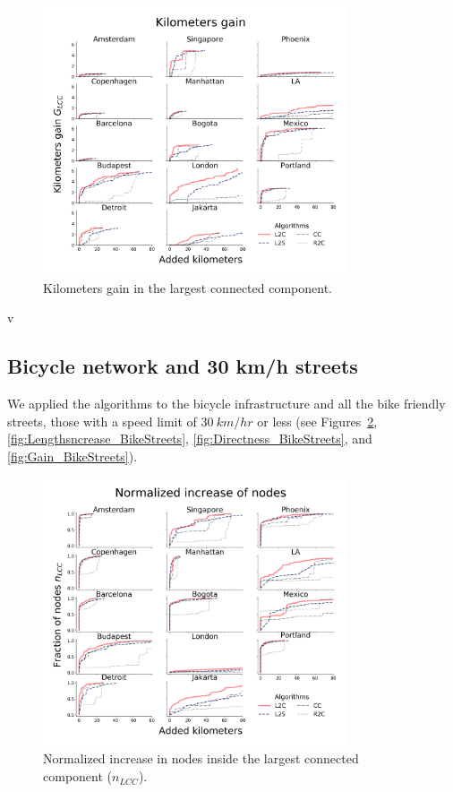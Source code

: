 \begin{figure}[h!]
  \centering
  \includegraphics[width=0.8\textwidth]{images/datadriven/SI_Gain.png}
  \caption{Kilometers gain in the largest connected component.}
  \label{fig:Gain}
\end{figure}
v

\subsection{Bicycle network and 30 km/h streets}\label{SI:BikeStreets}
We applied the algorithms to the bicycle infrastructure and all the bike friendly streets, those with a speed limit of $30\ km/hr$ or less (see Figures~\ref{fig:NodesIncrease_BikeStreets}, \ref{fig:Lengthsncrease_BikeStreets}, \ref{fig:Directness_BikeStreets}, and \ref{fig:Gain_BikeStreets}).

\begin{figure}[h!]
  \centering
  \includegraphics[width=0.8\textwidth]{images/datadriven/SI_Nodes_Bike_Streets.png}
  \caption{Normalized increase in nodes inside the largest connected component ($n_{LCC}$).}
  \label{fig:NodesIncrease_BikeStreets}
\end{figure}

